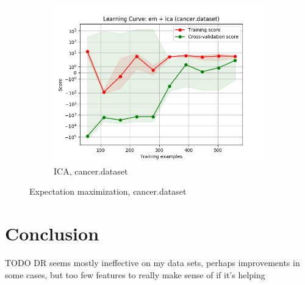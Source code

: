 \documentclass{article}
\begin{document}
\begin{figure}[htb]
\begin{subfigure}{0.33\textwidth}
        \includegraphics[width=\linewidth]{out/cluster_dr/cancer-em-ica-learning.png}
        \caption{ICA, cancer.dataset}
      \end{subfigure}

    \caption{Expectation maximization, cancer.dataset}
    \label{fig:cdr-plot-em-cancer}
    \end{figure}

  \section{Conclusion}
    TODO DR seems mostly ineffective on my data sets, perhaps improvements in some cases, but too few features to really make sense of if it's helping 
\end{document}
